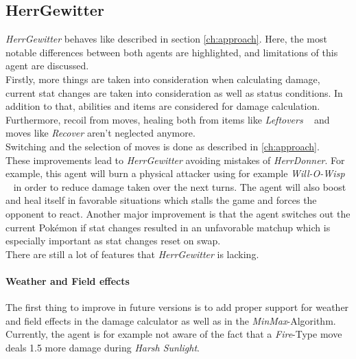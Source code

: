 \subsection{HerrGewitter}
\label{sec:HerrGewitter}
\textit{HerrGewitter} behaves like described in section \ref{ch:approach}. Here, the most notable
differences between both agents are highlighted, and limitations of this agent are discussed. \\
Firstly, more things are taken into consideration when calculating damage, current stat changes are
taken into consideration as well as status conditions. In addition to that, abilities and items
are considered for damage calculation. Furthermore, recoil from moves, healing both from items
like \textit{Leftovers} ~\autocite{Bulbapedia:Leftovers} and moves like \textit{Recover} aren't neglected
anymore. \\
Switching and the selection of moves is done as described in \ref{ch:approach}. \\
These improvements lead to \textit{HerrGewitter} avoiding mistakes of \textit{HerrDonner}. For example,
this agent will burn a physical attacker using for example \textit{Will-O-Wisp} ~\autocite{Bulbapedia:Will-O-Wisp}
in order to reduce damage taken over the next turns. The agent will also boost and heal itself in favorable
situations which stalls the game and forces the opponent to react. Another major improvement is that the
agent switches out the current Pokémon if stat changes resulted in an unfavorable matchup which is especially
important as stat changes reset on swap. \\
There are still a lot of features that \textit{HerrGewitter} is lacking. 

\paragraph{Weather and Field effects}
The first thing to improve in future versions is to add proper support for weather and field effects in 
the damage calculator as well as in the \textit{MinMax}-Algorithm. Currently, the agent is for example
not aware of the fact that a \textit{Fire}-Type move deals 1.5 more damage during \textit{Harsh Sunlight}.

